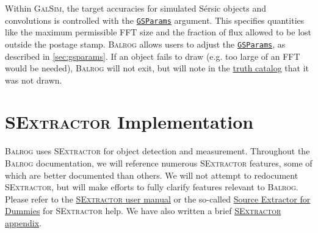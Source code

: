 \documentclass[11pt]{book}
\newcommand{\galsim}{\textsc{GalSim}}
\newcommand{\balrog}{\textsc{Balrog}}
\newcommand{\sex}{\textsc{SExtractor}}
\newcommand{\sersic}{S\'{e}rsic}
\begin{document}
Within \galsim{}, the target accuracies for simulated \sersic{} objects and convolutions is controlled with the 
\href{http://galsim-developers.github.io/GalSim/structgalsim\_1\_1\_g\_s\_params.html}{\texttt{GSParams}} argument.
This specifies quantities like the maximum permissible FFT size and the fraction of flux allowed to be lost outside the postage stamp.
\balrog{} allows users to adjust the \href{http://galsim-developers.github.io/GalSim/structgalsim\_1\_1\_g\_s\_params.html}{\texttt{GSParams}}, 
as described in \autoref{sec:gsparams}.
If an object fails to draw (e.g. too large of an FFT would be needed),
\balrog{} will not exit, but will note in the \hyperref[sec:catalogs]{truth catalog} that it was not drawn.




\section{\sex{} Implementation}
\label{sec:processing}

\balrog{} uses \sex{} for object detection and measurement.
Throughout the \balrog{} documentation, we will reference numerous \sex{} features, 
some of which are better documented than others.
We will not attempt to redocument \sex{}, but will make efforts to fully clarify features relevant to \balrog{}.
Please refer to the \href{https://www.astromatic.net/pubsvn/software/sextractor/trunk/doc/sextractor.pdf}{\sex{} user manual} 
or the so-called \href{http://astroa.physics.metu.edu.tr/MANUALS/sextractor/Guide2source\_extractor.pdf}{Source Extractor for Dummies}
for \sex{} help.
We have also written a brief \hyperref[sec:quicksex]{\sex{} appendix}.
\end{document}
